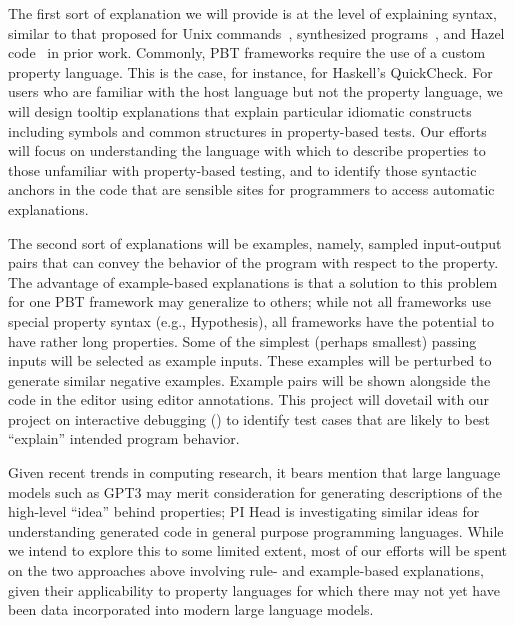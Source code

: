 The first sort of explanation we will provide is at the level of explaining 
syntax, similar to that proposed for Unix commands~\cite{ref:head2015tutorons}, 
synthesized programs~\cite{ref:mayer2015user}, and Hazel 
code~\cite{ref:potter2022contextualized} in prior work. Commonly, PBT frameworks 
require the use of a custom property language. This is the case, for instance, 
for Haskell's QuickCheck. For users who are familiar with the host language but 
not the property language, we will design tooltip explanations that explain 
particular idiomatic constructs including symbols and common structures in 
property-based tests. Our efforts will focus on understanding the language with 
which to describe properties to those unfamiliar with property-based testing, 
and to identify those syntactic anchors in the code that are sensible sites for 
programmers to access automatic explanations. 

The second sort of explanations will be examples, namely, sampled input-output 
pairs that can convey the behavior of the program with respect to the property.  
The advantage of example-based explanations is that a solution to this problem 
for one PBT framework may generalize to others; while not all frameworks use 
special property syntax (e.g., Hypothesis), all frameworks have the potential to 
have rather long properties. Some of the simplest (perhaps smallest) passing 
inputs will be selected as example inputs. These examples will be perturbed to 
generate similar negative examples. Example pairs will be shown alongside the 
code in the editor using editor annotations. This project will dovetail with our 
project on interactive debugging () to identify
test cases that are likely to best ``explain'' intended program behavior.

Given recent trends in computing research, it bears mention that large language 
models such as GPT3 may merit consideration for generating descriptions of the 
high-level ``idea'' behind properties; PI Head is investigating similar ideas 
for understanding generated code in general purpose programming languages. While 
we intend to explore this to some limited extent, most of our efforts will be 
spent on the two approaches above involving rule- and example-based 
explanations, given their applicability to property languages for which there 
may not yet have been data incorporated into modern large language models.

\iflater{}\fi

